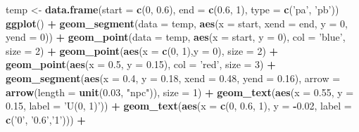 \documentclass[]{article}
\newenvironment{Shaded}{\begin{snugshade}}{\end{snugshade}}
\newcommand{\KeywordTok}[1]{\textcolor[rgb]{0.13,0.29,0.53}{\textbf{#1}}}
\newcommand{\DataTypeTok}[1]{\textcolor[rgb]{0.13,0.29,0.53}{#1}}
\newcommand{\DecValTok}[1]{\textcolor[rgb]{0.00,0.00,0.81}{#1}}
\newcommand{\FloatTok}[1]{\textcolor[rgb]{0.00,0.00,0.81}{#1}}
\newcommand{\StringTok}[1]{\textcolor[rgb]{0.31,0.60,0.02}{#1}}
\newcommand{\OperatorTok}[1]{\textcolor[rgb]{0.81,0.36,0.00}{\textbf{#1}}}
\newcommand{\NormalTok}[1]{#1}
\begin{document}
\begin{Shaded}
\begin{Highlighting}[]
\NormalTok{temp <-}\StringTok{ }\KeywordTok{data.frame}\NormalTok{(}\DataTypeTok{start =} \KeywordTok{c}\NormalTok{(}\DecValTok{0}\NormalTok{, }\FloatTok{0.6}\NormalTok{), }\DataTypeTok{end =} \KeywordTok{c}\NormalTok{(}\FloatTok{0.6}\NormalTok{, }\DecValTok{1}\NormalTok{), }\DataTypeTok{type =} \KeywordTok{c}\NormalTok{(}\StringTok{'pa'}\NormalTok{, }\StringTok{'pb'}\NormalTok{))}
\KeywordTok{ggplot}\NormalTok{() }\OperatorTok{+}\StringTok{ }
\StringTok{  }\KeywordTok{geom_segment}\NormalTok{(}\DataTypeTok{data =}\NormalTok{ temp, }\KeywordTok{aes}\NormalTok{(}\DataTypeTok{x =}\NormalTok{ start, }\DataTypeTok{xend =}\NormalTok{ end, }\DataTypeTok{y =} \DecValTok{0}\NormalTok{, }\DataTypeTok{yend =} \DecValTok{0}\NormalTok{)) }\OperatorTok{+}\StringTok{ }
\StringTok{  }\KeywordTok{geom_point}\NormalTok{(}\DataTypeTok{data =}\NormalTok{ temp, }\KeywordTok{aes}\NormalTok{(}\DataTypeTok{x =}\NormalTok{ start, }\DataTypeTok{y =} \DecValTok{0}\NormalTok{), }\DataTypeTok{col =} \StringTok{'blue'}\NormalTok{, }\DataTypeTok{size =} \DecValTok{2}\NormalTok{) }\OperatorTok{+}
\StringTok{  }\KeywordTok{geom_point}\NormalTok{(}\KeywordTok{aes}\NormalTok{(}\DataTypeTok{x =} \KeywordTok{c}\NormalTok{(}\DecValTok{0}\NormalTok{, }\DecValTok{1}\NormalTok{),}\DataTypeTok{y =} \DecValTok{0}\NormalTok{), }\DataTypeTok{size =} \DecValTok{2}\NormalTok{) }\OperatorTok{+}
\StringTok{  }\KeywordTok{geom_point}\NormalTok{(}\KeywordTok{aes}\NormalTok{(}\DataTypeTok{x =} \FloatTok{0.5}\NormalTok{, }\DataTypeTok{y =} \FloatTok{0.15}\NormalTok{), }\DataTypeTok{col =} \StringTok{'red'}\NormalTok{, }\DataTypeTok{size =} \DecValTok{3}\NormalTok{) }\OperatorTok{+}
\StringTok{  }\KeywordTok{geom_segment}\NormalTok{(}\KeywordTok{aes}\NormalTok{(}\DataTypeTok{x =} \FloatTok{0.4}\NormalTok{, }\DataTypeTok{y =} \FloatTok{0.18}\NormalTok{, }\DataTypeTok{xend =} \FloatTok{0.48}\NormalTok{, }\DataTypeTok{yend =} \FloatTok{0.16}\NormalTok{), }
               \DataTypeTok{arrow =} \KeywordTok{arrow}\NormalTok{(}\DataTypeTok{length =} \KeywordTok{unit}\NormalTok{(}\FloatTok{0.03}\NormalTok{, }\StringTok{"npc"}\NormalTok{)), }\DataTypeTok{size =} \DecValTok{1}\NormalTok{) }\OperatorTok{+}
\StringTok{  }\KeywordTok{geom_text}\NormalTok{(}\KeywordTok{aes}\NormalTok{(}\DataTypeTok{x =} \FloatTok{0.55}\NormalTok{, }\DataTypeTok{y =} \FloatTok{0.15}\NormalTok{, }\DataTypeTok{label =} \StringTok{'U(0, 1)'}\NormalTok{)) }\OperatorTok{+}
\StringTok{  }\KeywordTok{geom_text}\NormalTok{(}\KeywordTok{aes}\NormalTok{(}\DataTypeTok{x =} \KeywordTok{c}\NormalTok{(}\DecValTok{0}\NormalTok{, }\FloatTok{0.6}\NormalTok{, }\DecValTok{1}\NormalTok{), }\DataTypeTok{y =} \OperatorTok{-}\FloatTok{0.02}\NormalTok{, }\DataTypeTok{label =} \KeywordTok{c}\NormalTok{(}\StringTok{'0'}\NormalTok{, }\StringTok{'0.6'}\NormalTok{,}\StringTok{'1'}\NormalTok{))) }\OperatorTok{+}

\end{Highlighting}
\end{Shaded}
\end{document}

